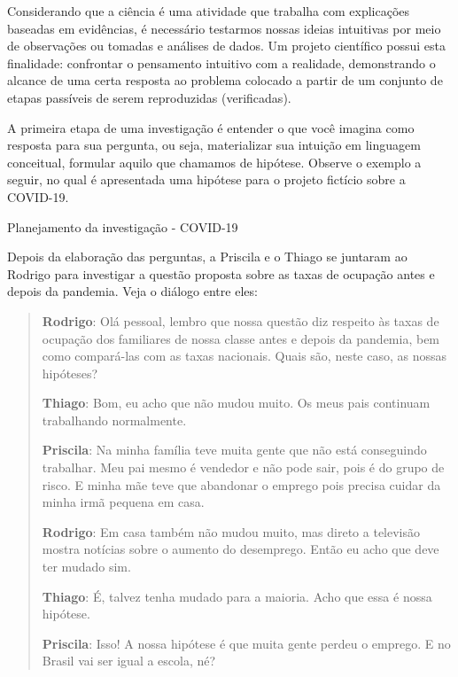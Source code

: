 Considerando que a ciência é uma atividade que trabalha com explicações baseadas em evidências, é necessário testarmos nossas ideias intuitivas por meio de observações ou tomadas e análises de dados. Um projeto científico possui esta finalidade: confrontar o pensamento intuitivo com a realidade, demonstrando o alcance de uma certa resposta ao problema colocado a partir de um conjunto de etapas passíveis de serem reproduzidas (verificadas).

A primeira etapa de uma investigação é entender o que você imagina  como resposta para sua pergunta, ou seja, materializar sua intuição em linguagem conceitual, formular aquilo que chamamos de hipótese. Observe o exemplo a seguir, no qual é apresentada uma hipótese para o projeto fictício sobre a COVID-19.


\begin{example}{Planejamento da investigação - COVID-19}

Depois da elaboração das perguntas, a Priscila e o Thiago se juntaram ao Rodrigo para investigar a questão proposta sobre as taxas de ocupação antes e depois da pandemia. Veja o diálogo entre eles:

\begin{quote}
\textbf{Rodrigo}: Olá pessoal, lembro que nossa questão diz respeito às taxas de ocupação dos familiares de nossa classe antes e depois da pandemia, bem como compará-las com as taxas nacionais. Quais são, neste caso, as nossas hipóteses?

\textbf{Thiago}: Bom, eu acho que não mudou muito. Os meus pais continuam trabalhando normalmente.

\textbf{Priscila}: Na minha família teve muita gente que não está conseguindo trabalhar. Meu pai mesmo é vendedor e não pode sair, pois é do grupo de risco. E minha mãe teve que abandonar o emprego pois precisa cuidar da minha irmã pequena em casa.

\textbf{Rodrigo}: Em casa também não mudou muito, mas direto a televisão mostra notícias sobre o aumento do desemprego. Então eu acho que deve ter mudado sim.

\textbf{Thiago}: É, talvez tenha mudado para a maioria. Acho que essa é nossa hipótese.

\textbf{Priscila}: Isso! A nossa hipótese é que muita gente perdeu o emprego. E no Brasil vai ser igual a escola, né?
\end{quote}

\end{example}

